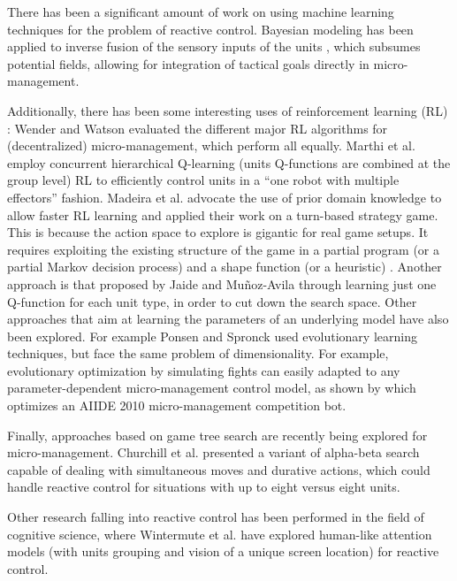 \documentclass[journal]{IEEEtran}
\begin{document}
There has been a significant amount of work on using machine learning techniques for the problem of reactive control. Bayesian modeling has been applied to inverse fusion of the sensory inputs of the units \cite{SynnaeveMicroCig11}, which subsumes potential fields, allowing for integration of tactical goals directly in micro-management. 

Additionally, there has been some interesting uses of reinforcement learning (RL) \cite{Sutton}: 
Wender and Watson \cite{WenderRL} evaluated the different major RL algorithms for (decentralized) micro-management, which perform all equally. Marthi et al. \cite{Marthi05} employ concurrent hierarchical Q-learning (units Q-functions are combined at the group level) RL to efficiently control units in a ``one robot with multiple effectors'' fashion. Madeira et al. \cite{Madeira06} advocate the use of prior domain knowledge to allow faster RL learning and applied their work on a turn-based strategy game. This is because the action space to explore is gigantic for real game setups. It requires exploiting the existing structure of the game in a partial program (or a partial Markov decision process) and a shape function (or a heuristic) \cite{Marthi05}. Another approach is that proposed by Jaide and Mu{\~n}oz-Avila \cite{jaidee2012classq} through learning just one Q-function for each unit type, in order to cut down the search space. Other approaches that aim at learning the parameters of an underlying model have also been explored. For example Ponsen and Spronck \cite{GA} used evolutionary learning techniques, but face the same problem of dimensionality. For example, evolutionary optimization by simulating fights can easily adapted to any parameter-dependent micro-management control model, as shown by \cite{OthmanSimu} which optimizes an AIIDE 2010 micro-management competition bot.

Finally, approaches based on game tree search are recently being explored for micro-management. Churchill et al. \cite{churchill2012AIIDE} presented a variant of alpha-beta search capable of dealing with simultaneous moves and durative actions, which could handle reactive control for situations with up to eight versus eight units. 

Other research falling into reactive control has been performed in the field of cognitive science, where Wintermute et al. \cite{SORTS} have explored human-like attention models (with units grouping and vision of a unique screen location) for reactive control.
\end{document}
